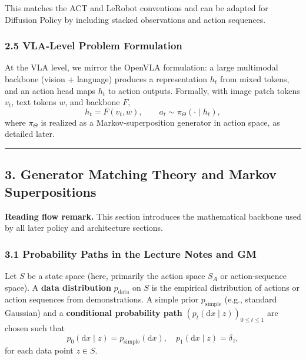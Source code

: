 \documentclass[
]{article}
\theoremstyle{remark}
\begin{document}
This matches the ACT and LeRobot conventions and can be adapted for
Diffusion Policy by including stacked observations and action
sequences. \cite{diffusion-policy-repo,act-openarm-notes}

\subsubsection{2.5 VLA-Level Problem
Formulation}\label{vla-level-problem-formulation}

At the VLA level, we mirror the OpenVLA formulation: a large multimodal
backbone (vision + language) produces a representation \(h_t\) from
mixed tokens, and an action head maps \(h_t\) to action outputs.
Formally, with image patch tokens \(v_t\), text tokens \(w\), and
backbone \(F\), \cite{openvla-notes} \[
 h_t = F(v_t, w), \qquad a_t \sim \pi_\Theta(\cdot \mid h_t),
\] where \(\pi_\Theta\) is realized as a Markov-superposition generator
in action space, as detailed later. \cite{diffpolicy-theory-notes,openvla-notes}

\begin{center}\rule{0.5\linewidth}{0.5pt}\end{center}

\subsection{3. Generator Matching Theory and Markov
Superpositions}\label{generator-matching-theory-and-markov-superpositions}

\textbf{Reading flow remark.} This section introduces the mathematical backbone used by all later policy and architecture sections.

\subsubsection{3.1 Probability Paths in the Lecture Notes and
GM}\label{probability-paths-in-the-lecture-notes-and-gm}

Let \(S\) be a state space (here, primarily the action space \(S_A\) or
action-sequence space). A \textbf{data distribution} \(p_{\text{data}}\)
on \(S\) is the empirical distribution of actions or action sequences
from demonstrations. A simple prior \(p_{\text{simple}}\) (e.g.,
standard Gaussian) and a \textbf{conditional probability path}
\((p_t(\mathrm{d}x \mid z))_{0 \le t \le 1}\) are chosen such
that \cite{gm2025,gm-companion-notes} \[
 p_0(\mathrm{d}x \mid z) = p_{\text{simple}}(\mathrm{d}x), \quad p_1(\mathrm{d}x \mid z) = \delta_z, 
\] for each data point \(z \in S\). \cite{gm-companion-notes,gm2025}
\end{document}

